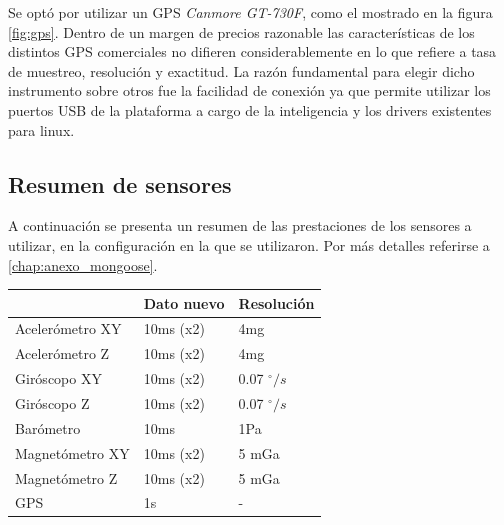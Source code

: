 \documentclass[main]{subfiles}
\begin{document}
Se opt\'o por utilizar un GPS \textit{Canmore GT-730F}, como el mostrado en la figura \ref{fig:gps}. Dentro de un margen de precios razonable las caracter\'isticas de los distintos GPS comerciales no difieren considerablemente en lo que refiere a tasa de muestreo, resoluci\'on y exactitud. La raz\'on fundamental para elegir dicho instrumento sobre otros fue la facilidad de conexi\'on ya que permite utilizar los puertos USB de la plataforma a cargo de la inteligencia y los drivers existentes para linux. \\ 

\subsection{Resumen de sensores}
\label{sec:hardware:resumen-de-sensores}

A continuaci\'on se presenta un resumen de las prestaciones de los sensores a utilizar, en la configuraci\'on en la que se utilizaron. Por m\'as detalles referirse a \ref{chap:anexo_mongoose}.

\begin{table}[H]
\begin{center}
\begin{tabular}{|p{3.5cm}|p{2.05cm}|p{2.05cm}|}
\hline
 & Dato nuevo & Resoluci\'on \\
\hline
Aceler\'ometro XY & 10ms (x2)& 4mg\\
\hline
Aceler\'ometro Z  & 10ms (x2)& 4mg\\
\hline
Gir\'oscopo XY  & 10ms (x2)& 0.07 $^\circ/s$\\
\hline
Gir\'oscopo Z  & 10ms (x2)& 0.07 $^\circ/s$\\
\hline
Bar\'ometro  & 10ms & 1Pa\\
\hline
Magnet\'ometro XY  & 10ms  (x2)& 5 mGa\\
\hline
Magnet\'ometro Z  & 10ms (x2)& 5 mGa\\
\hline
GPS  & 1s & - \\
\hline
\end{tabular}
\label{tab:hardware:resumen-sensores}
\end{center}
\end{table}
\end{document}
